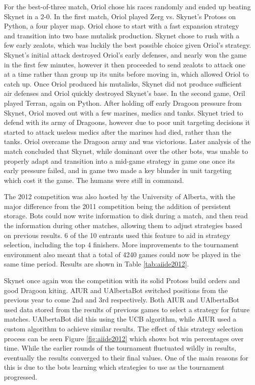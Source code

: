\documentclass[journal]{IEEEtran}
\begin{document}
For the best-of-three match, Oriol chose his races randomly and ended up beating Skynet in a 2-0. 
In the first match, Oriol played Zerg vs. Skynet's Protoss on Python, a four player map. Oriol chose
to start with a fast expansion strategy and transition into two base mutalisk production. Skynet chose
to rush with a few early zealots, which was luckily the best possible choice given Oriol's strategy.
Skynet's initial attack destroyed Oriol's early defenses, and nearly won the game in the first few
minutes, however it then proceeded to send zealots to attack one at a time rather than group up its
units before moving in, which allowed Oriol to catch up. Once Oriol produced his mutalisks, Skynet did
not produce sufficient air defenses and Oriol quickly destroyed Skynet's base. In the second game,
Oril played Terran, again on Python. After holding off early Dragoon pressure from Skynet, Oriol
moved out with a few marines, medics and tanks. Skynet tried to defend with its army of Dragoons,
however due to poor unit targeting decisions it started to attack useless medics after the marines
had died, rather than the tanks. Oriol overcame the Dragoon army and was victorious. Later analysis
of the match concluded that Skynet, while dominant over the other bots, was unable to properly
adapt and transition into a mid-game strategy in game one once its early pressure failed, and in game
two made a key blunder in unit targeting which cost it the game. The humans were still in command.

The 2012 competition was also hosted by the University of Alberta, with the major difference from the 2011
competition being the addition of persistent storage. Bots could now write information to disk during a
match, and then read the information during other matches, allowing them to adjust strategies based
on previous results. 6 of the 10 entrants used this feature to aid in strategy selection, including the
top 4 finishers. More improvements to the tournament environment also meant that a total of 4240 games
could now be played in the same time period. Results are shown in Table \ref{tab:aiide2012}.

Skynet once again won the competition with its solid Protoss build orders and good Dragoon kiting. AIUR
and UAlbertaBot switched positions from the previous year to come 2nd and 3rd respectively. Both AIUR
and UAlbertaBot used data stored from the results of previous games to select a strategy for future matches.
UAlbertaBot did this using the UCB algorithm, while AIUR used a custom algorithm to achieve similar
results. The effect of this strategy selection process can be seen Figure \ref{fig:aiide2012} which shows bot
win percentages over time. While the earlier rounds of the tournament fluctuated wildly in results,
eventually the results converged to their final values. One of the main reasons for this is due to
the bots learning which strategies to use as the tournament progressed.
\end{document}
